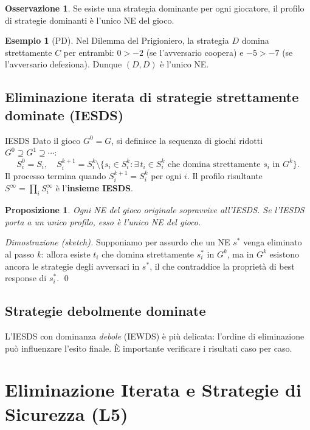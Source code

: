 \documentclass[12pt,a4paper,twoside]{book}
\theoremstyle{plain}
\newtheorem{proposition}[theorem]{Proposizione}
\theoremstyle{definition}
\newtheorem{example}[theorem]{Esempio}
\newtheorem{remark}[theorem]{Osservazione}
\begin{document}
\begin{remark}
Se esiste una strategia dominante per ogni giocatore, il profilo di strategie dominanti è l'unico NE del gioco.
\end{remark}

\begin{example}[PD]
Nel Dilemma del Prigioniero, la strategia $D$ domina strettamente $C$ per entrambi: $0>-2$ (se l'avversario coopera) e $-5>-7$ (se l'avversario defeziona). Dunque $(D,D)$ è l'unico NE.
\end{example}

\section{Eliminazione iterata di strategie strettamente dominate (IESDS)}

\begin{defbox}{IESDS}
Dato il gioco $G^0=G$, si definisce la sequenza di giochi ridotti $G^0\supseteq G^1\supseteq\cdots$:
\[
  S_i^0 = S_i,\quad S_i^{k+1} = S_i^k \setminus \{s_i\in S_i^k : \exists\, t_i\in S_i^k \text{ che domina strettamente } s_i \text{ in } G^k\}.
\]
Il processo termina quando $S_i^{k+1}=S_i^k$ per ogni $i$. Il profilo risultante $S^\infty = \prod_i S_i^\infty$ è l'\textbf{insieme IESDS}.
\end{defbox}

\begin{proposition}
Ogni NE del gioco originale sopravvive all'IESDS. Se l'IESDS porta a un unico profilo, esso è l'unico NE del gioco.
\end{proposition}

\textit{Dimostrazione (sketch).} Supponiamo per assurdo che un NE $s^*$ venga eliminato al passo $k$: allora esiste $t_i$ che domina strettamente $s^*_i$ in $G^k$, ma in $G^k$ esistono ancora le strategie degli avversari in $s^*$, il che contraddice la proprietà di best response di $s^*_i$. \qed

\section{Strategie debolmente dominate}

L'IESDS con dominanza \emph{debole} (IEWDS) è più delicata: l'ordine di eliminazione può influenzare l'esito finale. È importante verificare i risultati caso per caso.

\chapter{Eliminazione Iterata e Strategie di Sicurezza (L5)}
\end{document}
